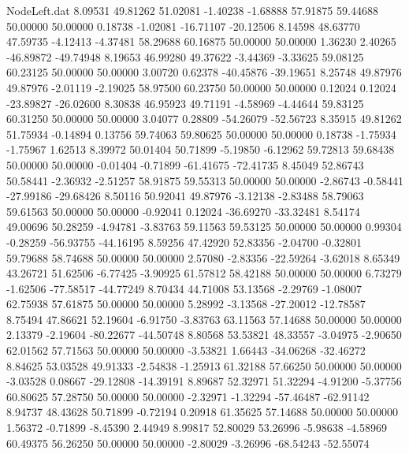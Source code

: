 \begin{filecontents}{NodeLeft.dat}
   8.09531   49.81262   51.02081    -1.40238   -1.68888   57.91875   59.44688   50.00000   50.00000    0.18738   -1.02081  -16.71107  -20.12506
   8.14598   48.63770   47.59735    -4.12413   -4.37481   58.29688   60.16875   50.00000   50.00000    1.36230    2.40265  -46.89872  -49.74948
   8.19653   46.99280   49.37622    -3.44369   -3.33625   59.08125   60.23125   50.00000   50.00000    3.00720    0.62378  -40.45876  -39.19651
   8.25748   49.87976   49.87976    -2.01119   -2.19025   58.97500   60.23750   50.00000   50.00000    0.12024    0.12024  -23.89827  -26.02600
   8.30838   46.95923   49.71191    -4.58969   -4.44644   59.83125   60.31250   50.00000   50.00000    3.04077    0.28809  -54.26079  -52.56723
   8.35915   49.81262   51.75934    -0.14894    0.13756   59.74063   59.80625   50.00000   50.00000    0.18738   -1.75934   -1.75967    1.62513
   8.39972   50.01404   50.71899    -5.19850   -6.12962   59.72813   59.68438   50.00000   50.00000   -0.01404   -0.71899  -61.41675  -72.41735
   8.45049   52.86743   50.58441    -2.36932   -2.51257   58.91875   59.55313   50.00000   50.00000   -2.86743   -0.58441  -27.99186  -29.68426
   8.50116   50.92041   49.87976    -3.12138   -2.83488   58.79063   59.61563   50.00000   50.00000   -0.92041    0.12024  -36.69270  -33.32481
   8.54174   49.00696   50.28259    -4.94781   -3.83763   59.11563   59.53125   50.00000   50.00000    0.99304   -0.28259  -56.93755  -44.16195
   8.59256   47.42920   52.83356    -2.04700   -0.32801   59.79688   58.74688   50.00000   50.00000    2.57080   -2.83356  -22.59264   -3.62018
   8.65349   43.26721   51.62506    -6.77425   -3.90925   61.57812   58.42188   50.00000   50.00000    6.73279   -1.62506  -77.58517  -44.77249
   8.70434   44.71008   53.13568    -2.29769   -1.08007   62.75938   57.61875   50.00000   50.00000    5.28992   -3.13568  -27.20012  -12.78587
   8.75494   47.86621   52.19604    -6.91750   -3.83763   63.11563   57.14688   50.00000   50.00000    2.13379   -2.19604  -80.22677  -44.50748
   8.80568   53.53821   48.33557    -3.04975   -2.90650   62.01562   57.71563   50.00000   50.00000   -3.53821    1.66443  -34.06268  -32.46272
   8.84625   53.03528   49.91333    -2.54838   -1.25913   61.32188   57.66250   50.00000   50.00000   -3.03528    0.08667  -29.12808  -14.39191
   8.89687   52.32971   51.32294    -4.91200   -5.37756   60.80625   57.28750   50.00000   50.00000   -2.32971   -1.32294  -57.46487  -62.91142
   8.94737   48.43628   50.71899    -0.72194    0.20918   61.35625   57.14688   50.00000   50.00000    1.56372   -0.71899   -8.45390    2.44949
   8.99817   52.80029   53.26996    -5.98638   -4.58969   60.49375   56.26250   50.00000   50.00000   -2.80029   -3.26996  -68.54243  -52.55074

\end{filecontents}
